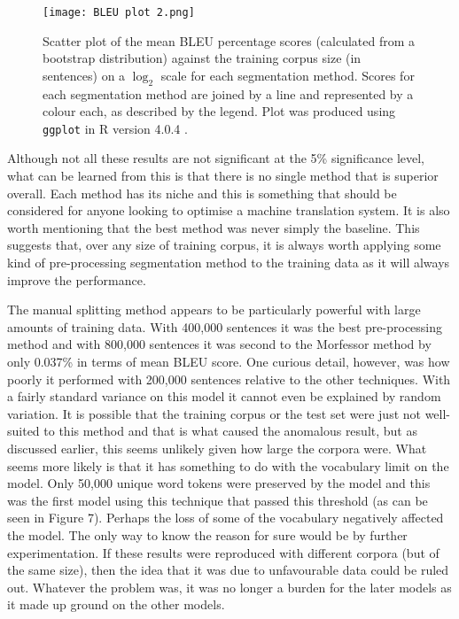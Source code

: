 \documentclass[11pt]{article}
\begin{document}
\bigskip

\begin{figure}[h]
    \centering
    \texttt{[image: BLEU plot 2.png]}
    \caption{Scatter plot of the mean BLEU percentage scores (calculated from a bootstrap distribution) against the training corpus size (in sentences) on a $\log_2$ scale for each segmentation method. Scores for each segmentation method are joined by a line and represented by a colour each, as described by the legend. Plot was produced using \texttt{ggplot} \citep{ggplot} in R version 4.0.4 \citep{R}.}
    \label{fig:bleu}
\end{figure}

Although not all these results are not significant at the 5\% significance level, what can be learned from this is that there is no single method that is superior overall. Each method has its niche and this is something that should be considered for anyone looking to optimise a machine translation system. It is also worth mentioning that the best method was never simply the baseline. This suggests that, over any size of training corpus, it is always worth applying some kind of pre-processing segmentation method to the training data as it will always improve the performance.

\newpage

The manual splitting method appears to be particularly powerful with large amounts of training data. With 400,000 sentences it was the best pre-processing method and with 800,000 sentences it was second to the Morfessor method by only 0.037\% in terms of mean BLEU score. One curious detail, however, was how poorly it performed with 200,000 sentences relative to the other techniques. With a fairly standard variance on this model it cannot even be explained by random variation. It is possible that the training corpus or the test set were just not well-suited to this method and that is what caused the anomalous result, but as discussed earlier, this seems unlikely given how large the corpora were. What seems more likely is that it has something to do with the vocabulary limit on the model. Only 50,000 unique word tokens were preserved by the model and this was the first model using this technique that passed this threshold (as can be seen in Figure 7). Perhaps the loss of some of the vocabulary negatively affected the model. The only way to know the reason for sure would be by further experimentation. If these results were reproduced with different corpora (but of the same size), then the idea that it was due to unfavourable data could be ruled out. Whatever the problem was, it was no longer a burden for the later models as it made up ground on the other models.
\end{document}
